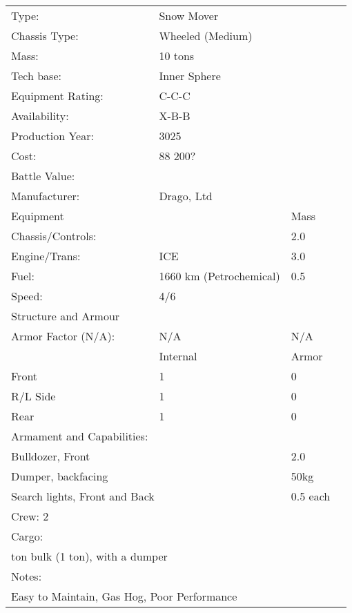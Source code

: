 \documentclass{tufte-book}
\begin{document}
\bigskip
\begin{minipage}{\textwidth}
\begin{center}
\begin{tabular}{llll}
\toprule
Type: & Snow Mover & \\
Chassis Type: & Wheeled (Medium) & \\
Mass: & 10 tons & \\
Tech base: & Inner Sphere & \\
Equipment Rating: & C-C-C & \\
Availability: & X-B-B & \\
Production Year: & 3025 & \\
Cost: & 88 200? & \\
Battle Value: & & \\
Manufacturer: & Drago, Ltd & \\
Equipment & & Mass \\
\quad Chassis/Controls: & & 2.0 \\
\quad Engine/Trans: & ICE  & 3.0 \\
\quad Fuel: & 1660 km (Petrochemical) & 0.5 \\
\quad Speed: & \multicolumn{2}{l}{4/6} \\
Structure and Armour & & \\
\quad Armor Factor (N/A): & N/A & N/A \\
\quad & Internal & Armor \\
\quad Front & 1 & 0 \\
\quad R/L Side & 1 & 0 \\
\quad Rear & 1 & 0 \\
Armament and Capabilities: & & \\
\multicolumn{2}{l}{\quad Bulldozer, Front} & 2.0 \\
\multicolumn{2}{l}{\quad Dumper, backfacing} & 50kg \\
\multicolumn{2}{l}{\quad 2 Search lights, Front and Back} & 0.5 each \\

\multicolumn{3}{l}{Crew: 2} \\
Cargo: & & \\
\multicolumn{3}{l}{\quad 1 ton bulk (1 ton), with a dumper} \\

Notes: & & \\
\multicolumn{3}{l}{\quad Easy to Maintain, Gas Hog, Poor Performance} \\
\bottomrule
\end{tabular}
\end{center}
\end{minipage}
\end{document}
